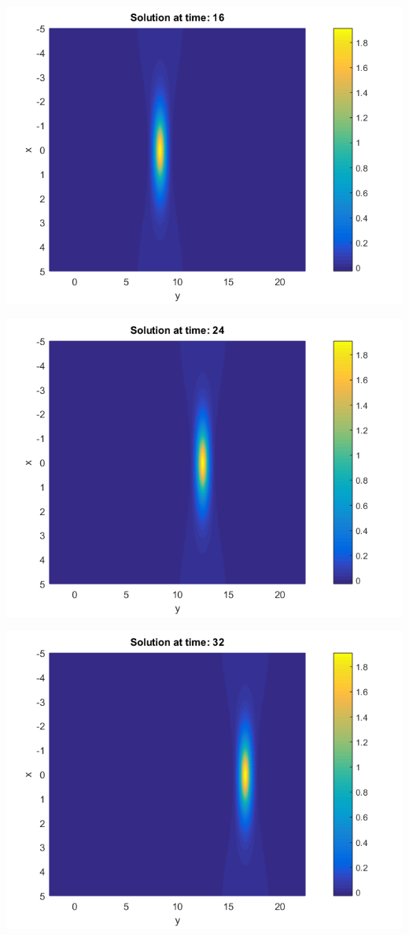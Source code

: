 \documentclass{beamer}
\begin{document}
\begin{frame}
\begin{center}
\begin{minipage}[b]{0.30\linewidth}
		 \includegraphics[width=\linewidth]{figures/Solution_bt3_t=16.png}
	\end{minipage}
	\begin{minipage}[b]{0.30\linewidth}
		\includegraphics[width=\linewidth]{figures/Solution_bt3_t=24.png}
	\end{minipage}	
	\begin{minipage}[b]{0.30\linewidth}
		 \includegraphics[width=\linewidth]{figures/Solution_bt3_t=32.png}

\end{minipage}
\end{center}
\end{frame}
\end{document}

